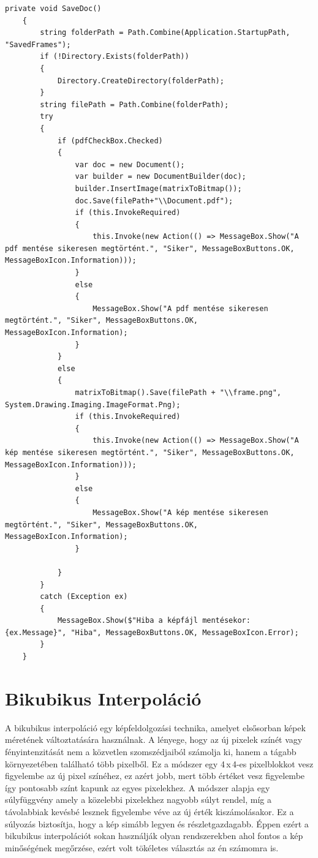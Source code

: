 \documentclass[]{thesis-ekf}
\theoremstyle{definition}
\theoremstyle{remark}
\begin{document}
\begin{lstlisting}[language=CSharp]
	private void SaveDoc()
	{
		string folderPath = Path.Combine(Application.StartupPath, "SavedFrames");
		if (!Directory.Exists(folderPath))
		{
			Directory.CreateDirectory(folderPath);
		}
		string filePath = Path.Combine(folderPath);
		try 
		{
			if (pdfCheckBox.Checked)
			{
				var doc = new Document();
				var builder = new DocumentBuilder(doc);
				builder.InsertImage(matrixToBitmap());
				doc.Save(filePath+"\\Document.pdf");
				if (this.InvokeRequired)
				{
					this.Invoke(new Action(() => MessageBox.Show("A pdf mentése sikeresen megtörtént.", "Siker", MessageBoxButtons.OK, MessageBoxIcon.Information)));
				}
				else
				{
					MessageBox.Show("A pdf mentése sikeresen megtörtént.", "Siker", MessageBoxButtons.OK, MessageBoxIcon.Information);
				}
			}
			else
			{
				matrixToBitmap().Save(filePath + "\\frame.png", System.Drawing.Imaging.ImageFormat.Png);
				if (this.InvokeRequired)
				{
					this.Invoke(new Action(() => MessageBox.Show("A kép mentése sikeresen megtörtént.", "Siker", MessageBoxButtons.OK, MessageBoxIcon.Information)));
				}
				else
				{
					MessageBox.Show("A kép mentése sikeresen megtörtént.", "Siker", MessageBoxButtons.OK, MessageBoxIcon.Information);
				}
				
			}
		}
		catch (Exception ex)
		{
			MessageBox.Show($"Hiba a képfájl mentésekor: {ex.Message}", "Hiba", MessageBoxButtons.OK, MessageBoxIcon.Error);
		}
	}
\end{lstlisting}
\section{Bikubikus Interpoláció}
A bikubikus interpoláció egy képfeldolgozási technika, amelyet elsősorban képek méretének változtatására használnak. A lényege, hogy az új pixelek színét vagy fényintenzitását nem a közvetlen szomszédjaiból számolja ki, hanem a tágabb környezetében található több pixelből. Ez a módszer egy 4\,x\,4-es pixelblokkot vesz figyelembe az új pixel színéhez, ez azért jobb, mert több értéket vesz figyelembe így pontosabb színt kapunk az egyes pixelekhez. A módszer alapja egy súlyfüggvény amely a közelebbi pixelekhez nagyobb súlyt rendel, míg a távolabbiak kevésbé lesznek figyelembe véve az új érték kiszámolásakor. Ez a súlyozás biztosítja, hogy a kép simább legyen és részletgazdagabb. Éppen ezért a bikubikus interpolációt sokan használják olyan rendszerekben ahol fontos a kép minőségének megőrzése, ezért volt tökéletes választás az én számomra is. 
\end{document}
